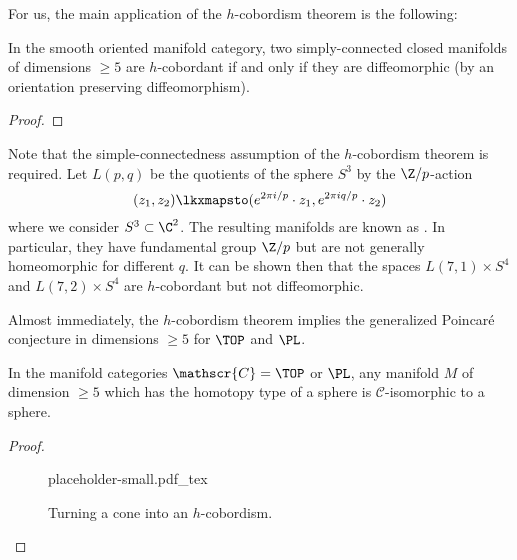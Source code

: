 For us, the main application of the $h$-cobordism theorem is the following:

\begin{corollary}\label{thm:h-cobordism-diffeomorphism}
	In the smooth oriented manifold category, two simply-connected closed manifolds of dimensions $\geq 5$ are $h$-cobordant if and only if they are diffeomorphic (by an orientation preserving diffeomorphism).
\end{corollary}
\begin{proof}
\end{proof}

\begin{remark}
	Note that the simple-connectedness assumption of the $h$-cobordism theorem is required. Let $L(p,q)$ be the quotients of the sphere $S^3$ by the $\Z/p$-action 
	\[
		(z_1,z_2) \lkxmapsto (e^{2\pi i/p}\cdot z_1, e^{2\pi i q/p}\cdot z_2)
	\]
	where we consider $S^3\subset \C^2$. The resulting manifolds are known as .  In particular, they have fundamental group $\Z/p$ but are not generally homeomorphic for different $q$. It can be shown then that the spaces $L(7,1)\times S^4$ and $L(7,2)\times S^4$ are $h$-cobordant but not diffeomorphic. 
\end{remark}

Almost immediately, the $h$-cobordism theorem implies the generalized Poincar\'e conjecture in dimensions $\geq 5$ for $\TOP$ and $\PL$. 

\begin{corollary}\label{thm:generalized-poincare-smale}
	In the manifold categories $\mathscr{C}=\TOP$ or $\PL$, any manifold $M$ of dimension $\geq 5$ which has the homotopy type of a sphere is $\mathscr{C}$-isomorphic to a sphere.	
\end{corollary}
\begin{proof}
	\begin{figure}[ht]
		\centering
		{placeholder-small.pdf_tex}
		\caption{Turning a cone into an $h$-cobordism.}
	\end{figure}
\end{proof}


